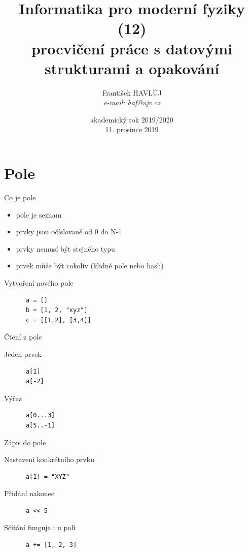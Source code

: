 \documentclass{beamer}
\title[IMF (12)]{Informatika pro moderní fyziky (12)\\ procvičení práce s datovými strukturami a opakování}
\author[Franti\v{s}ek HAVL\r{U}J, ORF ÚJV Řež]{Franti\v{s}ek HAVL\r{U}J\\{\scriptsize \emph{e-mail: haf@ujv.cz}}}
\date{akademický rok 2019/2020\\11. prosince 2019}
\institute[ORF ÚJV Řež]
{ÚJV Řež\\oddělení Reaktorové fyziky a podpory palivového cyklu}
\begin{document}
\begin{frame}
  \titlepage
\end{frame}

\begin{frame}
  \tableofcontents
\end{frame}

\section{Pole}

\begin{frame}{Co je pole}
  \begin{itemize}
    \item pole je seznam
    \item prvky jsou očíslované od 0 do N-1
    \item prvky nemusí být stejného typu
    \item prvek může být cokoliv (klidně pole nebo hash)
  \end{itemize}
\end{frame}

\begin{frame}[fragile]{Vytvoření nového pole}
  \begin{block}{}
    \begin{verbatim}
      a = []
      b = [1, 2, "xyz"]
      c = [[1,2], [3,4]]
    \end{verbatim}
  \end{block}
\end{frame}

\begin{frame}[fragile]{Čtení z pole}
  \begin{block}{Jeden prvek}
    \begin{verbatim}
      a[1]
      a[-2]
    \end{verbatim}
  \end{block}
  \begin{block}{Výřez}
    \begin{verbatim}
      a[0...3]
      a[5..-1]
    \end{verbatim}
  \end{block}
\end{frame}
%
\begin{frame}[fragile]{Zápis do pole}
  \begin{block}{Nastavení konkrétního prvku}
    \begin{verbatim}
      a[1] = "XYZ"
    \end{verbatim}
  \end{block}
  \begin{block}{Přidání nakonec}
    \begin{verbatim}
      a << 5
    \end{verbatim}
  \end{block}
  \begin{block}{Sčítání funguje i u polí}
    \begin{verbatim}
      a += [1, 2, 3]
    \end{verbatim}
  \end{block}
\end{frame}
\end{document}
